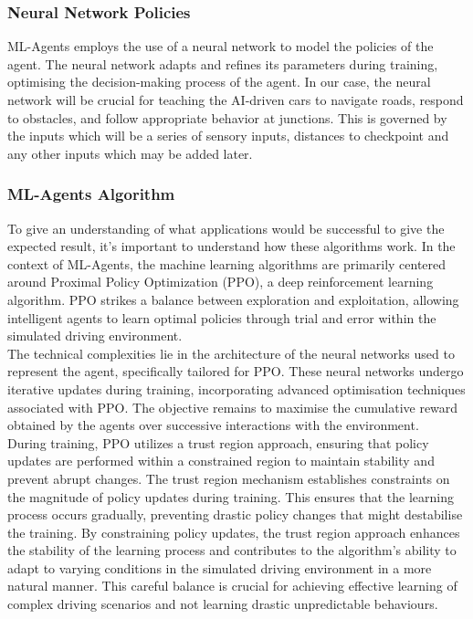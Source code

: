 \documentclass{article}
\begin{document}
\subsubsection{Neural Network Policies}
ML-Agents employs the use of a neural network to model the policies of the agent. The neural network adapts and refines its parameters during training, optimising the decision-making process of the agent. In our case, the neural network will be crucial for teaching the AI-driven cars to navigate roads, respond to obstacles, and follow appropriate behavior at junctions. This is governed by the inputs which will be a series of sensory inputs, distances to checkpoint and any other inputs which may be added later.

\subsubsection{ML-Agents Algorithm}
To give an understanding of what applications would be successful to give the expected result, it's important to understand how these algorithms work. In the context of ML-Agents, the machine learning algorithms are primarily centered around Proximal Policy Optimization (PPO), a deep reinforcement learning algorithm. PPO strikes a balance between exploration and exploitation, allowing intelligent agents to learn optimal policies through trial and error within the simulated driving environment.\cite{PPO-MLAgents}\\

 The technical complexities lie in the architecture of the neural networks used to represent the agent, specifically tailored for PPO. These neural networks undergo iterative updates during training, incorporating advanced optimisation techniques associated with PPO. The objective remains to maximise the cumulative reward obtained by the agents over successive interactions with the environment.\\

 During training, PPO utilizes a trust region approach, ensuring that policy updates are performed within a constrained region to maintain stability and prevent abrupt changes. The trust region mechanism establishes constraints on the magnitude of policy updates during training. This ensures that the learning process occurs gradually, preventing drastic policy changes that might destabilise the training. By constraining policy updates, the trust region approach enhances the stability of the learning process and contributes to the algorithm's ability to adapt to varying conditions in the simulated driving environment in a more natural manner. This careful balance is crucial for achieving effective learning of complex driving scenarios and not learning drastic unpredictable behaviours.\\
\end{document}

